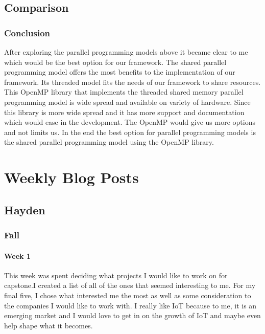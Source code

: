 \documentclass[draftclsnofoot, onecolumn, compsoc, 10pt]{IEEEtran}
\begin{document}
\subsection{Comparison}
\subsubsection{Conclusion}
After exploring the parallel programming models above it became clear to me which would be the best option for our framework. The shared parallel programming model offers the most benefits to the implementation of our framework. Its threaded model fits the needs of our framework to share resources. This OpenMP library that implements the threaded shared memory parallel programming model is wide spread and available on variety of hardware. Since this library is more wide spread and it has more support and documentation which would ease in the development. The OpenMP would give us more options and not limits us. In the end the best option for parallel programming models is the shared parallel programming model using the OpenMP library.



\newpage
\section{Weekly Blog Posts}

\subsection{Hayden}
\subsubsection{Fall}
\paragraph{Week 1}
This week was spent deciding what projects I would like to work on for capstone.I created a list of all of the ones that seemed interesting to me. For my final five, I chose what interested me the most as well as some consideration to the companies I would like to work with. I really like IoT because to me, it is an emerging market and I would love to get in on the growth of IoT and maybe even help shape what it becomes. 
\end{document}
